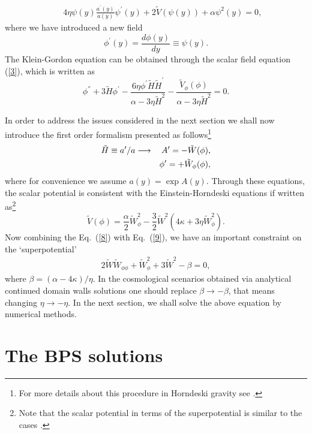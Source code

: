 \documentclass[aps,12pt, a4paper,nofootinbib]{revtex4}
\begin{document}
{\begin{eqnarray}
&&{4\eta\psi(y)\frac{a^{'}(y)}{a(y)}\psi^{'}(y)+2\tilde{V}(\psi(y))+\alpha\psi^{2}(y)=0},\label{7-8}
\end{eqnarray}
where we have introduced a new field
\begin{equation}
{\phi^{'}(y)=\frac{d\phi(y)}{dy}\equiv\psi(y)}.
\end{equation}
The Klein-Gordon equation can be obtained through the scalar field equation (\ref{3}), which is written as
\begin{equation}
\phi^{''}+3\tilde{H}\phi^{'}-\frac{6\eta\phi^{'}\tilde{H}\tilde{H}^{'}}{\alpha-3\eta \tilde{H}^{2}}-\frac{\tilde{V}_{\phi}(\phi)}{\alpha-3\eta\tilde{H}^{2}}=0.\label{9}
\end{equation}

In order to address the issues considered in the next section we shall now introduce the first order formalism presented as follows\footnote{For more details about this procedure in Horndeski gravity see \cite{Brito:2018pwe,Santos:2019ljs}.}
\begin{eqnarray}
\tilde{H}\equiv a{'}/a\longrightarrow &&A'=-\tilde{W}(\phi),\cr
&&\phi{'}=+\tilde{W}_{\phi}(\phi),\label{fist}
\end{eqnarray}
where for convenience we assume $a(y)=\exp A(y)$. Through these equations, the scalar potential is consistent with the Einstein-Horndeski equations if written as\footnote{Note that the scalar potential in terms of the superpotential is similar to the cases \cite{Brito:2018pwe,Santos:2019ljs}.}
\begin{equation}
\tilde{V}(\phi)=\frac{\alpha}{2}\tilde{W}_{\phi}^{2}-\frac{3}{2}\tilde{W}^{2}(4\kappa+3\eta\tilde{W}^{2}_{\phi}).\label{8}
\end{equation}
Now combining the Eq.~(\ref{8}) with Eq.~(\ref{9}), we have an important constraint on the `superpotential' 
\begin{eqnarray}
2\tilde{W}\tilde{W}_{\phi\phi}+\tilde{W}_{\phi}^{2}+3\tilde{W}^{2}-\beta=0,\label{10} 
\end{eqnarray}
where $\beta=(\alpha-4\kappa)/\eta$. In the cosmological scenarios obtained via analytical continued domain walls solutions one should replace $\beta\to -\beta$, that means changing $\eta\to -\eta$. In the next section, we shall solve the above equation by numerical methods.

\section{The BPS solutions}
\label{BBS-section}

}
\end{document}
